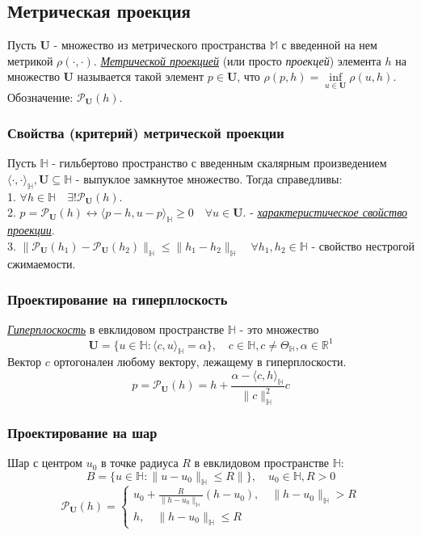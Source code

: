 \documentclass[A4]{article}
\begin{document}
\subsection{Метрическая проекция}
Пусть $\mathbf{U}$ - множество из метрического пространства $\mathbb{M}$ с введенной на нем метрикой $\rho(\cdot,\cdot)$. \underline{\emph{Метрической проекцией}} (или просто \emph{проекцей}) элемента $h$ на множество $\mathbf{U}$ называется такой элемент $p\in\mathbf{U}$, что $\rho(p,h)=\inf\limits_{u\in\mathbf{U}}\rho(u,h)$. Обозначение: $\mathcal{P}_{\mathbf{U}}(h)$. 
\subsubsection{Свойства (критерий) метрической проекции}
Пусть $\mathbb{H}$ - гильбертово пространство с введенным скалярным произведением $\langle\cdot,\cdot\rangle_{\mathbb{H}},\mathbf{U}\subseteq\mathbb{H}$ - выпуклое замкнутое множество. Тогда справедливы:\\
1. $\forall h\in\mathbb{H}\quad\exists!\mathcal{P}_{\mathbf{U}}(h)$.\\
2. $p=\mathcal{P}_{\mathbf{U}}(h)\leftrightarrow \langle p-h,u-p\rangle_{\mathbb{H}}\geqslant 0\quad\forall u\in\mathbf{U}$. - \underline{\emph{характеристическое свойство проекции}}.\\
3. $\|\mathcal{P}_{\mathbf{U}}(h_1)-\mathcal{P}_{\mathbf{U}}(h_2)\|_{\mathbb{H}}\leqslant\|h_1-h_2\|_{\mathbb{H}}\quad\forall h_1,h_2\in\mathbb{H}$ - свойство нестрогой сжимаемости.
\subsubsection{Проектирование на гиперплоскость}
\underline{\emph{Гиперплоскость}} в евклидовом пространстве $\mathbb{H}$ - это множество
\begin{equation*}
\mathbf{U}=\{u\in\mathbb{H}:\langle c,u\rangle_{\mathbb{H}}=\alpha \},\quad c\in\mathbb{H},c\ne\Theta_{\mathbb{H}},\alpha\in\mathbb{R}^1
\end{equation*}
Вектор $c$ ортогонален любому вектору, лежащему в гиперплоскости.\\
\begin{equation*}
p=\mathcal{P}_{\mathbf{U}}(h)=h+\frac{\alpha-\langle c,h\rangle_{\mathbb{H}}}{\|c\|^2_{\mathbb{H}}}c
\end{equation*}
\subsubsection{Проектирование на шар}
Шар с центром $u_0$ в точке радиуса $R$ в евклидовом пространстве $\mathbb{H}$:
\begin{equation*}
B=\{u\in\mathbb{H}:\|u-u_0\|_{\mathbb{H}} \leqslant R\|\},\quad u_0\in\mathbb{H},R>0
\end{equation*}
\begin{equation*}
\mathcal{P}_{\mathbf{U}}(h)=\left\{\begin{array}{l}
u_0+\frac{R}{\|h-u_0\|_{\mathbb{H}}}(h-u_0),\quad \|h-u_0\|_{\mathbb{H}}>R\\
h,\quad \|h-u_0\|_{\mathbb{H}}\leqslant R
\end{array}\right.
\end{equation*}
\end{document}

